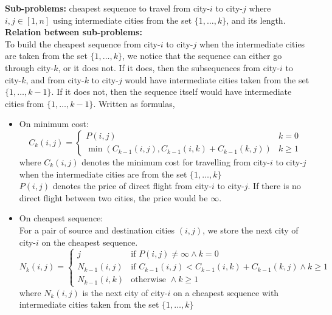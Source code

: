 \documentclass[12pt]{article}
\begin{document}
\pagebreak
\noindent\textbf{Sub-problems:} cheapest sequence to travel from city-\(i\) to city-\(j\) where \(i,j \in [1,n]\) using intermediate cities from the set \(\{1, \hdots, k\}\), and its length.\\
\textbf{Relation between sub-problems:}\\
 To build the cheapest sequence from city-\(i\) to city-\(j\) when the intermediate cities are taken from the set \(\{1, \hdots, k\}\), we notice that the sequence can either go through city-\(k\), or it does not. If it does, then the subsequences from city-\(i\) to city-\(k\), and from city-\(k\) to city-\(j\) would have intermediate cities taken from the set \(\{1, \hdots, k-1\}\). If it does not, then the sequence itself would have intermediate cities from \(\{1, \hdots, k-1\}\). Written as formulas,
\begin{itemize}
     \item On minimum cost:
     \begin{equation*}
          C_k (i,j) =
          \begin{cases}
               P(i, j) & k=0 \\
               \min (C_{k-1} (i, j), C_{k-1} (i, k) + C_{k-1} (k, j)) & k \geq 1
          \end{cases}
     \end{equation*}
     where \(C_k (i,j)\) denotes the minimum cost for travelling from city-\(i\) to city-\(j\) when the intermediate cities are from the set \(\{1, \hdots, k\}\)\\
     \(P(i,j)\) denotes the price of direct flight from city-\(i\) to city-\(j\). If there is no direct flight between two cities, the price would be \(\infty\).
     \item On cheapest sequence:\\
     For a pair of source and destination cities \((i, j)\), we store the next city of city-\(i\) on the cheapest sequence.
     \begin{equation*}
          N_k{(i,j)} =
          \begin{cases}
               j & \text{if } P(i, j) \neq \infty \land k=0\\
               N_{k-1} (i,j) & \text{if } C_{k-1} (i, j) < C_{k-1} (i, k) + C_{k-1} (k, j) \land k \geq 1 \\
               N_{k-1} (i,k) & \text{otherwise } \land k \geq 1
          \end{cases}
     \end{equation*}
     where \(N_k{(i,j)}\) is the next city of city-\(i\) on a cheapest sequence with intermediate cities taken from the set \(\{1, \hdots, k\}\)
\end{itemize}
\end{document}
